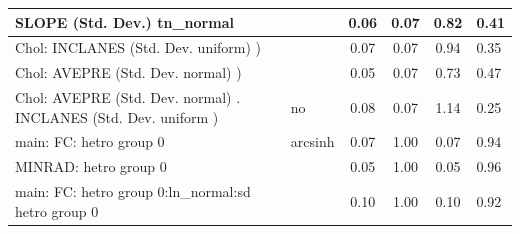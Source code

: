 \begin{table}
\begin{center}
\begin{tabular}{|l|l|c|c|c|l|}
			\hline
			SLOPE (Std. Dev.) tn_normal &  & 0.06 & 0.07 & 0.82 & 0.41 \\
			\hline
			 Chol: INCLANES (Std. Dev. uniform) ) &  & 0.07 & 0.07 & 0.94 & 0.35 \\
			\hline
			 Chol: AVEPRE (Std. Dev. normal) ) &  & 0.05 & 0.07 & 0.73 & 0.47 \\
			\hline
			 Chol: AVEPRE (Std. Dev. normal) . INCLANES (Std. Dev.   uniform ) & no & 0.08 & 0.07 & 1.14 & 0.25 \\
			\hline
			main: FC: hetro group 0 & arcsinh & 0.07 & 1.00 & 0.07 & 0.94 \\
			\hline
			MINRAD: hetro group 0 &  & 0.05 & 1.00 & 0.05 & 0.96 \\
			\hline
			main: FC: hetro group 0:ln_normal:sd  hetro group 0 &  & 0.10 & 1.00 & 0.10 & 0.92 \\
			\hline
		\end{tabular}
	\end{center}
\end{table}